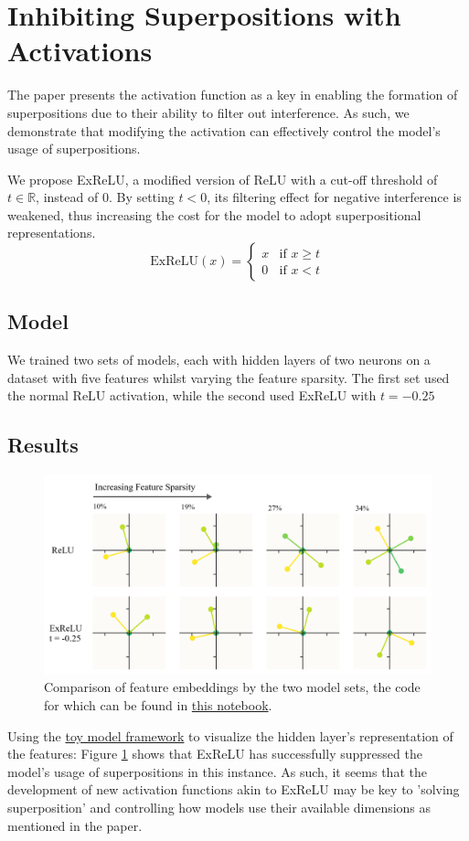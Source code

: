 \section{Inhibiting Superpositions with Activations}
\label{sec:act_fns}
The paper presents the activation function as a key in enabling the formation of superpositions due to their ability to
filter out interference. As such, we demonstrate that modifying the activation can effectively control the model's usage of
superpositions.

We propose ExReLU, a modified version of ReLU with a cut-off threshold of $t \in \mathbb{R}$, instead of $0$. By setting $t < 0$, its filtering effect for negative interference is weakened, thus
increasing the cost for the model to adopt superpositional representations.
\[
	\text{ExReLU}(x) =
	\begin{cases}
		x & \text{if } x \geq t \\
		0 & \text{if } x < t
	\end{cases}
\]

\subsection{Model}
We trained two sets of models, each with hidden layers of two neurons on a dataset with five features whilst varying the feature
sparsity. The first set used the normal ReLU activation, while the second used ExReLU with $t=-0.25$

\subsection{Results}
\begin{figure}[h]
	\centering
	\includegraphics[width=1\linewidth]{figures/acts_diagram.png}
	\caption{Comparison of feature embeddings by the two model sets, the code for which can be found in \href{https://colab.research.google.com/github/smurphnerd/FIT5047-assignment4/blob/main/act_visuals.ipynb}{this notebook}.}
	\label{fig:acts_diagram}
\end{figure}
Using the \href{https://colab.research.google.com/github/anthropics/toy-models-of-superposition/blob/main/toy_models.ipynb}{toy model framework} to visualize the hidden layer's representation of the features:
Figure \ref{fig:acts_diagram} shows that ExReLU has successfully suppressed the model's usage of superpositions in this instance.
As such, it seems that the development of new activation functions akin to ExReLU may be key to 'solving superposition' and controlling how models
use their available dimensions as mentioned in the paper.

